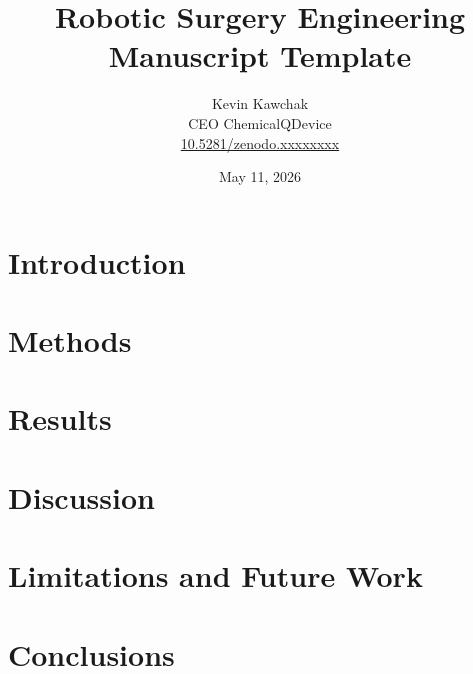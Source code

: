 \documentclass[11pt]{article}
\title{Robotic Surgery Engineering Manuscript Template}
\author{
  Kevin Kawchak\hspace{2pt}\orcidicon{0009-0007-5457-8667} \\
  CEO ChemicalQDevice\\
  \href{https://doi.org/10.5281/zenodo.xxxxxxxx}{10.5281/zenodo.xxxxxxxx} \\
}
\date{May 11, 2026}
\begin{document}
\maketitle

\begin{abstract}

\end{abstract}

\keywords{ }

\vspace{-0.2cm}

\section{Introduction}
\label{sec:introduction}


\tableofcontents
\vspace{0.4cm}

\newpage
\section{Methods}
\label{sec:methods}

\newpage

\section{Results}
\label{sec:results}

\newpage

\section{Discussion}
\label{sec:discussion}


\section{Limitations and Future Work}
\label{sec:limitations}

\newpage

\section{Conclusions}
\label{sec:conclusions}

\newpage

{}
\begingroup
\raggedright


\endgroup
\newpage


\end{document}
